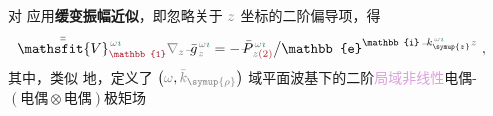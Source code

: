 对  应用\textbf{\textcolor{NavyBlue}{缓变振幅}近似}，即忽略关于 $\mathcolor{gray}{z}$ 坐标的二阶偏导项，得
\begin{align} \label{eq:nonlinear(2)-wave_wkrho-simplify6-V2'-SVA}
	\xint{\mathcolor{gray}{-}}{25}{\bar{\bar{\mathsfit{V}}}}^{\;\! \mathcolor{gray}{\omega} \textcolor{PineGreen}{\imath}}_{\textcolor{Maroon}{\mathbb{1}}} \mathcolor{gray}{\nabla_z} \xint{{}^{}_{\mathcolor{gray}{-}}}{10}{\bar{g}}^{\;\!\mathcolor{gray}{\omega} \textcolor{PineGreen}{\imath}}_{\;\! \mathcolor{gray}{z}} = - \xint{\mathcolor{gray}{-}}{30}{\bar{P}}^{\;\! \mathcolor{gray}{\omega} \textcolor{PineGreen}{\imath}}_{\;\! \mathcolor{gray}{z} \textcolor{Maroon}{(2)}} \big/ \mathbb{e}^{\mathbb{i} \xint{\begin{smallmatrix} ~ \\ {}^{}_{\mathcolor{gray}{-}} \\ ~ \end{smallmatrix}}{15}{k}_{\symup{z}}^{\;\! \mathcolor{gray}{\omega} \textcolor{PineGreen}{\imath}} \mathcolor{gray}{z}} ~,
\end{align}
其中，类似  地，定义了 $\left( \mathcolor{gray}{\omega}, \mathcolor{gray}{\bar{k}_{\symup{\rho}}} \right)$ 域\textcolor{PineGreen}{平面波基}下的二阶\textcolor{Plum}{局域}\textcolor{Plum}{非线性}\textcolor{NavyBlue}{电偶-$(\text{电偶}\otimes\text{电偶})$}极矩场
